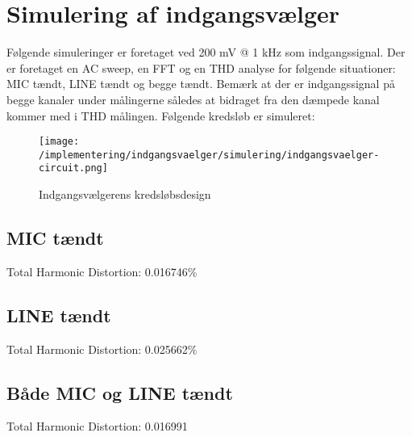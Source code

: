 \chapter*{Simulering af indgangsvælger}

Følgende simuleringer er foretaget ved 200 mV @ 1 kHz som indgangssignal. Der er foretaget en AC sweep, en FFT og en THD analyse for følgende situationer: MIC tændt, LINE tændt og begge tændt. Bemærk at der er indgangssignal på begge kanaler under målingerne således at bidraget fra den dæmpede kanal kommer med i THD målingen. Følgende kredsløb er simuleret:

\begin{figure}[h]
\centering
\texttt{[image: /implementering/indgangsvaelger/simulering/indgangsvaelger-circuit.png]}
\caption{Indgangsvælgerens kredsløbsdesign}
\label{}
\end{figure}


\section*{MIC tændt}
Total Harmonic Distortion: 0.016746\%



\section*{LINE tændt}
Total Harmonic Distortion: 0.025662\%


\section*{Både MIC og LINE tændt}
Total Harmonic Distortion: 0.016991%






